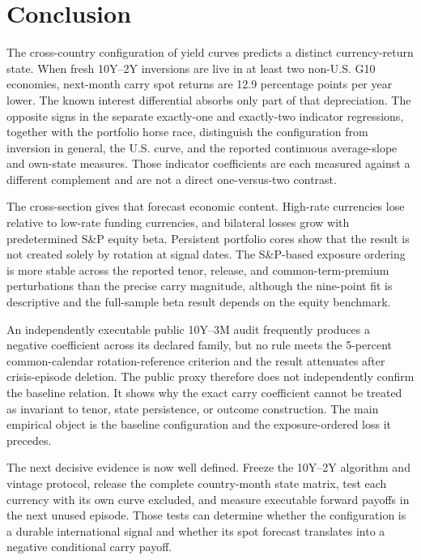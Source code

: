 \section{Conclusion}
\label{sec:conclusion}

The cross-country configuration of yield curves predicts a distinct currency-return state. When fresh 10Y--2Y inversions are live in at least two non-U.S. G10 economies, next-month carry spot returns are 12.9 percentage points per year lower. The known interest differential absorbs only part of that depreciation. The opposite signs in the separate exactly-one and exactly-two indicator regressions, together with the portfolio horse race, distinguish the configuration from inversion in general, the U.S. curve, and the reported continuous average-slope and own-state measures. Those indicator coefficients are each measured against a different complement and are not a direct one-versus-two contrast.

The cross-section gives that forecast economic content. High-rate currencies lose relative to low-rate funding currencies, and bilateral losses grow with predetermined S\&P equity beta. Persistent portfolio cores show that the result is not created solely by rotation at signal dates. The S\&P-based exposure ordering is more stable across the reported tenor, release, and common-term-premium perturbations than the precise carry magnitude, although the nine-point fit is descriptive and the full-sample beta result depends on the equity benchmark.

An independently executable public 10Y--3M audit frequently produces a negative coefficient across its declared family, but no rule meets the 5-percent common-calendar rotation-reference criterion and the result attenuates after crisis-episode deletion. The public proxy therefore does not independently confirm the baseline relation. It shows why the exact carry coefficient cannot be treated as invariant to tenor, state persistence, or outcome construction. The main empirical object is the baseline configuration and the exposure-ordered loss it precedes.

The next decisive evidence is now well defined. Freeze the 10Y--2Y algorithm and vintage protocol, release the complete country-month state matrix, test each currency with its own curve excluded, and measure executable forward payoffs in the next unused episode. Those tests can determine whether the configuration is a durable international signal and whether its spot forecast translates into a negative conditional carry payoff.
